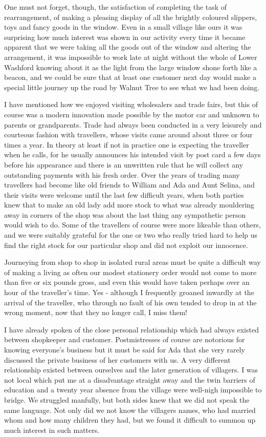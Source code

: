 One must not forget, though, the satisfaction of completing the task of rearrangement, of making a pleasing display of all the brightly coloured slippers, toys and fancy goods in the window. Even in a small village like ours it was surprising how much interest was shown in our activity every time it became apparent that we were taking all the goods out of the window and altering the arrangement, it was impossible to work late at night without the whole of Lower Washford knowing about it as the light from the large window shone forth like a beacon, and we could be sure that at least one customer next day would make a special little journey up the road by Walnut Tree to see what we had been doing.

I have mentioned how we enjoyed visiting wholesalers and trade fairs, but this of course was a modern innovation made possible by the motor car and unknown to parents or grandparents. Trade had always been conducted in a very leisurely and courteous fashion with travellers, whose visits came around about three or four times a year. In theory at least if not in practice one is expecting the traveller when he calls, for he usually announces his intended visit by post card a few days before his appearance and there is an unwritten rule that he will collect any outstanding payments with his fresh order. Over the years of trading many travellers had become like old friends to William and Ada and Aunt Selina, and their visits were welcome until the last few difficult years, when both parties knew that to make an old lady add more stock to what was already mouldering away in corners of the shop was about the last thing any sympathetic person would wish to do. Some of the travellers of course were more likeable than others, and we were suitably grateful for the one or two who really tried hard to help us find the right stock for our particular shop and did not exploit our innocence.

Journeying from shop to shop in isolated rural areas must be quite a difficult way of making a living as often our modest stationery order would not come to more than five or six pounds gross, and even this would have taken perhaps over an hour of the traveller's time. Yes - although I frequently groaned inwardly at the arrival of the traveller, who through no fault of his own tended to drop in at the wrong moment, now that they no longer call, I miss them!

I have already spoken of the close personal relationship which had always existed between shopkeeper and customer. Postmistresses of course are notorious for knowing everyone's business but it must be said for Ada that she very rarely discussed the private business of her customers with us. A very different relationship existed between ourselves and the later generation of villagers. I was not local which put me at a disadvantage straight away and the twin barriers of education and a twenty year absence from the village were well-nigh impossible to bridge. We struggled manfully, but both sides knew that we did not speak the same language. Not only did we not know the villagers names, who had married whom and how many children they had, but we found it difficult to summon up much interest in such matters.

